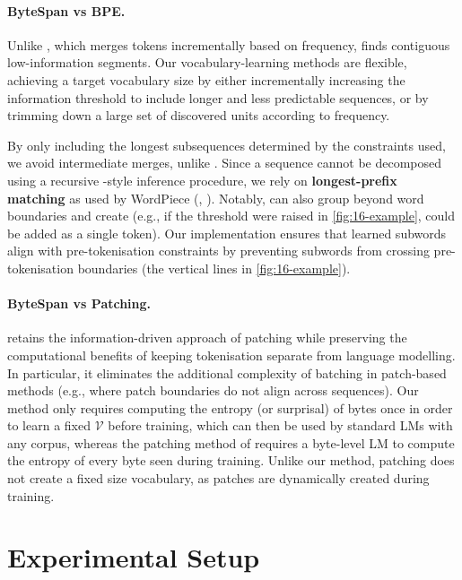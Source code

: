 \paragraph{ByteSpan vs BPE.}
Unlike \bpe, which merges tokens incrementally based on frequency, \tokname finds contiguous low-information segments. Our vocabulary-learning methods are flexible, achieving a target vocabulary size by either incrementally increasing the information threshold to include longer and less predictable sequences, or by trimming down a large set of discovered units according to frequency.

By only including the longest subsequences determined by the constraints used, we avoid intermediate merges, unlike \bpe. Since a sequence cannot be decomposed using a recursive \bpe-style inference procedure, we rely on \textbf{longest-prefix matching} as used by WordPiece (\wordpiece, \citealp{schuster-nakajima-2012-voice}). Notably, \tokname can also group beyond word boundaries and create  (e.g., if the threshold were raised in \cref{fig:16-example},  could be added as a single token). Our implementation ensures that learned subwords align with \bpe pre-tokenisation constraints by preventing subwords from crossing pre-tokenisation boundaries (the vertical lines in \cref{fig:16-example}).

\paragraph{ByteSpan vs Patching.}
\tokname retains the information-driven approach of patching while preserving the computational benefits of keeping tokenisation separate from language modelling. In particular, it eliminates the additional complexity of batching in patch-based methods (e.g., where patch boundaries do not align across sequences). Our method only requires computing the entropy (or surprisal) of bytes once in order to learn a fixed \(\mathcal{V}\) before training, which can then be used by standard LMs with any corpus, whereas the patching method of \citet{pagnoni2024byte} requires a byte-level LM to compute the entropy of every byte seen during training. Unlike our method, patching does not create a fixed size vocabulary, as patches are dynamically created during training.

\section{Experimental Setup}\label{sec:16-setup}

